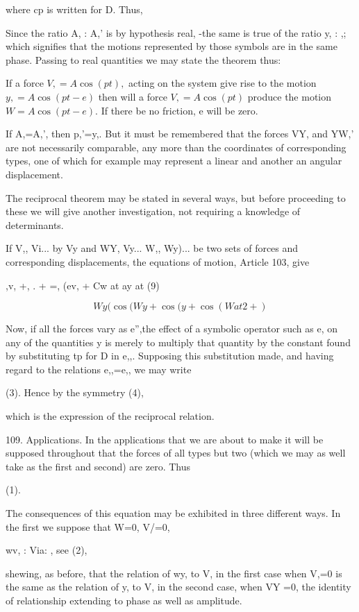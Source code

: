 where cp is written for D. Thus,


Since the ratio A, : A,' is by hypothesis real, -the same is true of the ratio
y, : ,; which signifies that the motions represented by those symbols are in
the same phase. Passing to real quantities we may state the theorem thus:

If a force \(V,= A \cos(pt),\) acting on the system give rise to the motion
\(y,= A \cos(pt-e)\) then will a force \(V, = A \cos(pt)\) produce the motion
\(W= A \cos(pt-e).\) If there be no friction, e will be zero.

If A,=A,', then p,'=y,. But it must be remembered that the forces VY, and YW,'
are not necessarily comparable, any more than the coordinates of corresponding
types, one of which for example may represent a linear and another an angular
displacement.

The reciprocal theorem may be stated in several ways, but before proceeding to
these we will give another investigation, not requiring a knowledge of
determinants.

If V,, Vi... by Vy and WY, Vy... W,, Wy)... be two sets of forces and
corresponding displacements, the equations of motion, Article 103, give

,v, +, . + =, (ev, + Cw at ay at (9)

\[Wy ( \cos(Wy + \cos(y + \cos(Wa t 2+)\]

Now, if all the forces vary as e'',the effect of a symbolic operator such as e,
on any of the quantities y is merely to multiply that quantity by the constant
found by substituting tp for D in e,,.  Supposing this substitution made, and
having regard to the relations e,,=e,, we may write

(3). Hence by the symmetry (4),

which is the expression of the reciprocal relation.

109.  Applications.  In the applications that we are about to make it will be
supposed throughout that the forces of all types but two (which we may as well
take as the first and second) are zero. Thus

(1).

The consequences of this equation may be exhibited in three different ways. In
the first we suppose that W=0, V/=0,

wv, : Via: , see (2),

shewing, as before, that the relation of wy, to V, in the first case when V,=0
is the same as the relation of y, to V, in the second case, when VY =0, the
identity of relationship extending to phase as well as amplitude.

